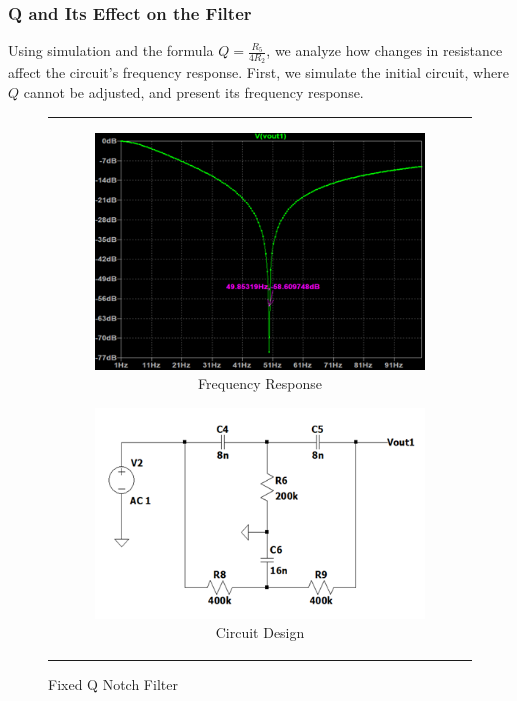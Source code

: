 \documentclass[hidelinks,12pt]{article}
\begin{document}
    \subsubsection{Q and Its Effect on the Filter}

	Using simulation and the formula \( Q = \frac{R_5}{4R_2} \), we analyze how changes in resistance affect the circuit's frequency response. First, we simulate the initial circuit, where \( Q \) cannot be adjusted, and present its frequency response.
	

	\begin{figure}[!h]
		\centering
			\begin{tabular}{c}
				\begin{subfigure}[t]{0.4\textwidth}
					\centering
					\includegraphics[width=\textwidth]{figures/Notch Filter Design/freq_response_fixed_q}
					\caption{Frequency Response}
				\end{subfigure}
				\hfill
				\begin{subfigure}[t]{0.45\textwidth}
					\centering
					\includegraphics[width=\textwidth]{figures/Notch Filter Design/fixed_q_circuit_design}
					\caption{Circuit Design}
				\end{subfigure} \\
			\end{tabular}
		\caption{Fixed Q Notch Filter}
	\end{figure}
\end{document}
